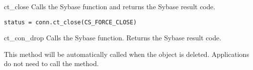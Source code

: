 \begin{methoddesc}[CS_CONNECTION]{ct_close}{}
Calls the Sybase  function and returns the Sybase
result code.

\begin{verbatim}
status = conn.ct_close(CS_FORCE_CLOSE)
\end{verbatim}
\end{methoddesc}

\begin{methoddesc}[CS_CONNECTION]{ct_con_drop}{}
Calls the Sybase  function.  Returns the
Sybase result code.

This method will be automatically called when the 
object is deleted.  Applications do not need to call the method.
\end{methoddesc}

